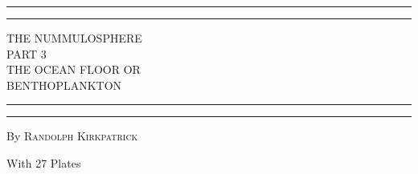 \documentclass[a4paper, 12pt, oneside]{article}
\begin{document}
\begin{titlepage} %
	\centering %
	\scshape %

	
	\rule{\textwidth}{1.6pt}\vspace*{-\baselineskip}\vspace*{2pt} %
	\rule{\textwidth}{0.4pt} %
	
	\vspace{0.75\baselineskip} %
	
	{\LARGE THE NUMMULOSPHERE\\ PART 3\\ THE OCEAN FLOOR OR\\ BENTHOPLANKTON\\} %
	
	\vspace{0.75\baselineskip} %
	
	\rule{\textwidth}{0.4pt}\vspace*{-\baselineskip}\vspace{3.2pt} %
	\rule{\textwidth}{1.6pt} %
	
	\vspace{1\baselineskip} %
	
	
	{By \scshape\Large Randolph Kirkpatrick\\} %
	
	\vspace*{1\baselineskip} %
	
    {\small With 27 Plates} %
    
	
	\vspace{1\baselineskip} %

	

\end{titlepage}
\end{document}
